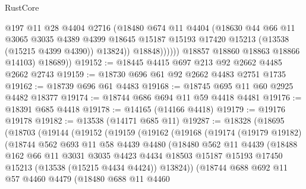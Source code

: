 \begin{lexlean}{RustCore}
\begin{coremodule}
                      @197
                      @11
                      @28
                      @4404
                      @2716
                      (@18480
                        @674
                        @11
                        @4404
                        (@18630
                          @44
                          @66
                          @11
                          @3065
                          @3035
                          @4389
                          @4399
                          @18645
                          @15187
                          @15193
                          @17420
                          @15213
                          (@13538 (@15215 @4399 @4390))
                          @13824))
                      @18848))))))
          @18857
          @18860
          @18863
          @18866
          @14103)
        @18689))
@19152 := @18445 @4415 @697 @213 @92 @2662 @4485 @2662 @2743
@19159 := @18730 @696 @61 @92 @2662 @4483 @2751 @1735
@19162 := @18739 @696 @61 @4483
@19168 := @18745 @695 @11 @60 @2925 @4482 @18377
@19174 := @18744 @686 @694 @11 @59 @4418 @4481
@19176 := @18391 @685 @4418
@19178 := @14165 (@14166 @4418)
@19179 := @19176 @19178
@19182 := @13538 (@14171 @685 @11)
@19287 := @18328
    (@18695
      (@18703
        (@19144
          (@19152
            (@19159
              (@19162
                (@19168
                  (@19174
                    (@19179 @19182)
                    (@18744
                      @562
                      @693
                      @11
                      @58
                      @4439
                      @4480
                      (@18480
                        @562
                        @11
                        @4439
                        (@18488
                          @162
                          @66
                          @11
                          @3031
                          @3035
                          @4423
                          @4434
                          @18503
                          @15187
                          @15193
                          @17450
                          @15213
                          (@13538 (@15215 @4434 @4424))
                          @13824))
                      (@18744
                        @688
                        @692
                        @11
                        @57
                        @4460
                        @4479
                        (@18480
                          @688
                          @11
                          @4460

\end{coremodule}
\end{lexlean}
